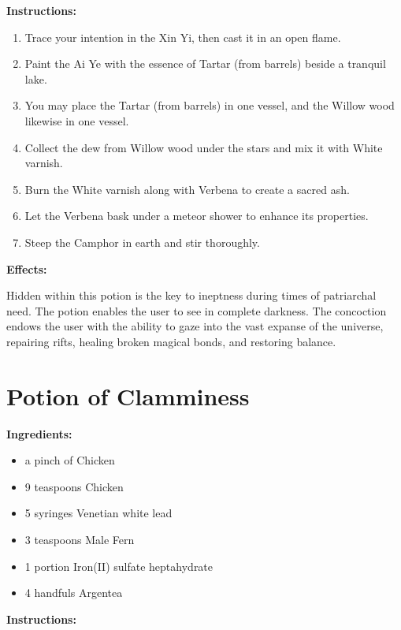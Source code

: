\documentclass{article}
\begin{document}
\textbf{Instructions:}

\begin{enumerate}
  \item Trace your intention in the Xin Yi, then cast it in an open flame.
  \item Paint the Ai Ye with the essence of Tartar (from barrels) beside a tranquil lake.
  \item You may place the Tartar (from barrels) in one vessel, and the Willow wood likewise in one vessel.
  \item Collect the dew from Willow wood under the stars and mix it with White varnish.
  \item Burn the White varnish along with Verbena to create a sacred ash.
  \item Let the Verbena bask under a meteor shower to enhance its properties.
  \item Steep the Camphor in earth and stir thoroughly.
\end{enumerate}

\textbf{Effects:}

Hidden within this potion is the key to ineptness during times of patriarchal need. The potion enables the user to see in complete darkness. The concoction endows the user with the ability to gaze into the vast expanse of the universe, repairing rifts, healing broken magical bonds, and restoring balance.

\newpage
\section*{Potion of Clamminess}

\textbf{Ingredients:}

\begin{itemize}
  \item a pinch of Chicken
  \item 9 teaspoons Chicken
  \item 5 syringes Venetian white lead
  \item 3 teaspoons Male Fern
  \item 1 portion Iron(II) sulfate heptahydrate
  \item 4 handfuls Argentea
\end{itemize}

\textbf{Instructions:}
\end{document}
